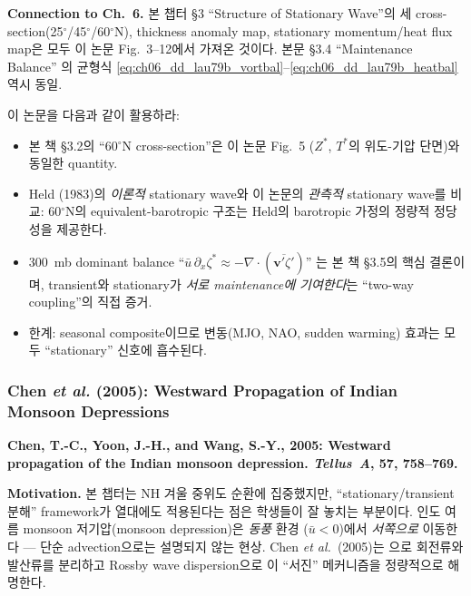 \medskip
\noindent\textbf{Connection to Ch.~6.}\quad
본 챕터 \S3 ``Structure of Stationary Wave''의 세 cross-section(25$^\circ$/45$^\circ$/60$^\circ$N),
thickness anomaly map, stationary momentum/heat flux map은 모두 이 논문 Fig.~3--12에서
가져온 것이다.  본문 \S3.4 ``Maintenance Balance'' 의 균형식
\eqref{eq:ch06_dd_lau79b_vortbal}--\eqref{eq:ch06_dd_lau79b_heatbal} 역시 동일.

\begin{hisublock}
이 논문을 다음과 같이 활용하라:
\begin{itemize}
  \item 본 책 \S3.2의 ``60$^\circ$N cross-section''은 이 논문 Fig.~5
        ($Z^*$, $T^*$의 위도-기압 단면)와 동일한 quantity.
  \item Held (1983)의 \emph{이론적} stationary wave와 이 논문의 \emph{관측적}
        stationary wave를 비교: 60$^\circ$N의 equivalent-barotropic 구조는
        Held의 barotropic 가정의 정량적 정당성을 제공한다.
  \item 300~mb dominant balance ``$\bar u\,\partial_x\zeta^* \approx -\nabla\cdot(\overline{\mathbf{v}'\zeta'})$''
        는 본 책 \S3.5의 핵심 결론이며,  transient와 stationary가
        \emph{서로 maintenance에 기여한다}는 ``two-way coupling''의 직접 증거.
  \item 한계: seasonal composite이므로  변동(MJO, NAO,
        sudden warming) 효과는 모두 ``stationary'' 신호에 흡수된다.
\end{itemize}
\end{hisublock}


\subsubsection{Chen \emph{et al.} (2005): Westward Propagation of Indian Monsoon Depressions}

\textbf{Chen, T.-C., Yoon, J.-H., and Wang, S.-Y., 2005:
Westward propagation of the Indian monsoon depression.
\emph{Tellus~A}, \textbf{57}, 758--769.}

\medskip
\noindent\textbf{Motivation.}\quad
본 챕터는 NH 겨울 중위도 순환에 집중했지만, ``stationary/transient 분해''
framework가 열대에도 적용된다는 점은 학생들이 잘 놓치는 부분이다.
인도 여름 monsoon 저기압(monsoon depression)은 \emph{동풍} 환경 ($\bar u < 0$)에서
\emph{서쪽으로} 이동한다 --- 단순 advection으로는 설명되지 않는 현상.
Chen \emph{et al.}\ (2005)는 으로 회전류와 발산류를 분리하고
Rossby wave dispersion으로 이 ``서진'' 메커니즘을 정량적으로 해명한다.

